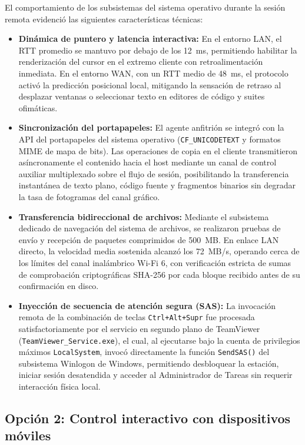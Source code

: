 \documentclass[12pt]{article}
\begin{document}
El comportamiento de los subsistemas del sistema operativo durante la sesión remota evidenció las siguientes características técnicas:
\begin{itemize}[noitemsep, topsep=4pt]
    \item \textbf{Dinámica de puntero y latencia interactiva:} En el entorno LAN, el RTT promedio se mantuvo por debajo de los 12~ms, permitiendo habilitar la renderización del cursor en el extremo cliente con retroalimentación inmediata. En el entorno WAN, con un RTT medio de 48~ms, el protocolo activó la predicción posicional local, mitigando la sensación de retraso al desplazar ventanas o seleccionar texto en editores de código y suites ofimáticas.
    \item \textbf{Sincronización del portapapeles:} El agente anfitrión se integró con la API del portapapeles del sistema operativo (\texttt{CF\_UNICODETEXT} y formatos MIME de mapa de bits). Las operaciones de copia en el cliente transmitieron asíncronamente el contenido hacia el host mediante un canal de control auxiliar multiplexado sobre el flujo de sesión, posibilitando la transferencia instantánea de texto plano, código fuente y fragmentos binarios sin degradar la tasa de fotogramas del canal gráfico.
    \item \textbf{Transferencia bidireccional de archivos:} Mediante el subsistema dedicado de navegación del sistema de archivos, se realizaron pruebas de envío y recepción de paquetes comprimidos de 500~MB. En enlace LAN directo, la velocidad media sostenida alcanzó los 72~MB/s, operando cerca de los límites del canal inalámbrico Wi-Fi 6, con verificación estricta de sumas de comprobación criptográficas SHA-256 por cada bloque recibido antes de su confirmación en disco.
    \item \textbf{Inyección de secuencia de atención segura (SAS):} La invocación remota de la combinación de teclas \texttt{Ctrl+Alt+Supr} fue procesada satisfactoriamente por el servicio en segundo plano de TeamViewer (\texttt{TeamViewer\_Service.exe}), el cual, al ejecutarse bajo la cuenta de privilegios máximos \texttt{LocalSystem}, invocó directamente la función \texttt{SendSAS()} del subsistema Winlogon de Windows, permitiendo desbloquear la estación, iniciar sesión desatendida y acceder al Administrador de Tareas sin requerir interacción física local.
\end{itemize}

\subsection{Opción 2: Control interactivo con dispositivos móviles}\label{sec:pruebasMovil}
\end{document}

